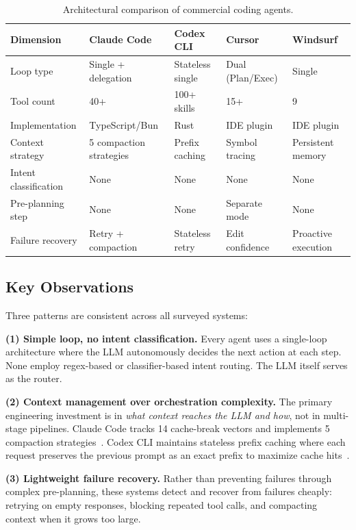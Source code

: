 \documentclass{article}
\begin{document}
\begin{table}[t]
\centering
\caption{Architectural comparison of commercial coding agents.}
\label{tab:agents}
\small
\begin{tabular}{@{}lllll@{}}
\toprule
\textbf{Dimension} & \textbf{Claude Code} & \textbf{Codex CLI} & \textbf{Cursor} & \textbf{Windsurf} \\
\midrule
Loop type & Single + delegation & Stateless single & Dual (Plan/Exec) & Single \\
Tool count & 40+ & 100+ skills & 15+ & 9 \\
Implementation & TypeScript/Bun & Rust & IDE plugin & IDE plugin \\
Context strategy & 5 compaction strategies & Prefix caching & Symbol tracing & Persistent memory \\
Intent classification & None & None & None & None \\
Pre-planning step & None & None & Separate mode & None \\
Failure recovery & Retry + compaction & Stateless retry & Edit confidence & Proactive execution \\
\bottomrule
\end{tabular}
\end{table}

\subsection{Key Observations}

Three patterns are consistent across all surveyed systems:

\textbf{(1) Simple loop, no intent classification.}
Every agent uses a single-loop architecture where the LLM autonomously decides the next action at each step. None employ regex-based or classifier-based intent routing. The LLM itself serves as the router.

\textbf{(2) Context management over orchestration complexity.}
The primary engineering investment is in \emph{what context reaches the LLM and how}, not in multi-stage pipelines.
Claude Code tracks 14 cache-break vectors and implements 5 compaction strategies~\cite{claudecodeleak2026}.
Codex CLI maintains stateless prefix caching where each request preserves the previous prompt as an exact prefix to maximize cache hits~\cite{codexloop2025}.

\textbf{(3) Lightweight failure recovery.}
Rather than preventing failures through complex pre-planning, these systems detect and recover from failures cheaply: retrying on empty responses, blocking repeated tool calls, and compacting context when it grows too large.
\end{document}
